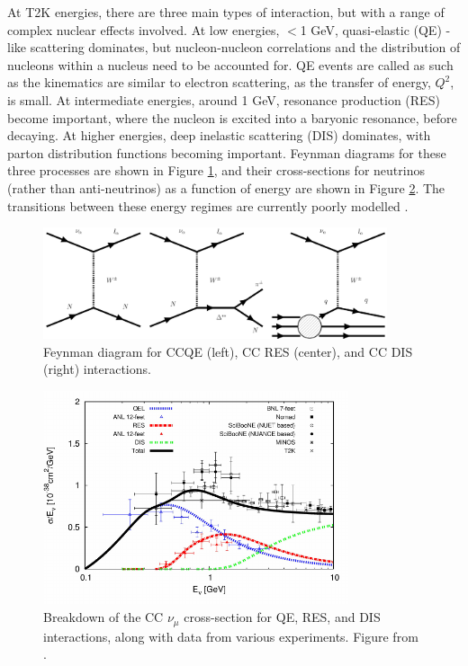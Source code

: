 At T2K energies, there are three main types of interaction, but with a range of complex nuclear effects involved. At low energies, $<$1 GeV, quasi-elastic (QE) -like scattering dominates, but nucleon-nucleon correlations and the distribution of nucleons within a nucleus need to be accounted for. QE events are called as such as the kinematics are similar to electron scattering, as the transfer of energy, $Q^2$, is small. At intermediate energies, around 1 GeV, resonance production (RES) become important, where the nucleon is excited into a baryonic resonance, before decaying. At higher energies, deep inelastic scattering (DIS) dominates, with parton distribution functions becoming important. Feynman diagrams for these three processes are shown in Figure \ref{feynmandiagrams}, and their cross-sections for neutrinos (rather than anti-neutrinos) as a function of energy are shown in Figure \ref{xsecpot}. The transitions between these energy regimes are currently poorly modelled \cite{models}.

\begin{figure}[!htbp]
\vspace{20pt}
\centering
\includegraphics*[width=0.9\textwidth,clip]{figs/feynmanCCs}
\caption{Feynman diagram for CCQE (left), CC RES (center), and CC DIS (right) interactions.
} \label{feynmandiagrams}
\end{figure}

\begin{figure}[!htbp]
\centering
\includegraphics*[width=0.8\textwidth,clip]{figs/xsections}
\caption{Breakdown of the CC $\nu_\mu$ cross-section for QE, RES, and DIS interactions, along with data from various experiments. Figure from \cite{nuxsec}.
} \label{xsecpot}
\end{figure}

